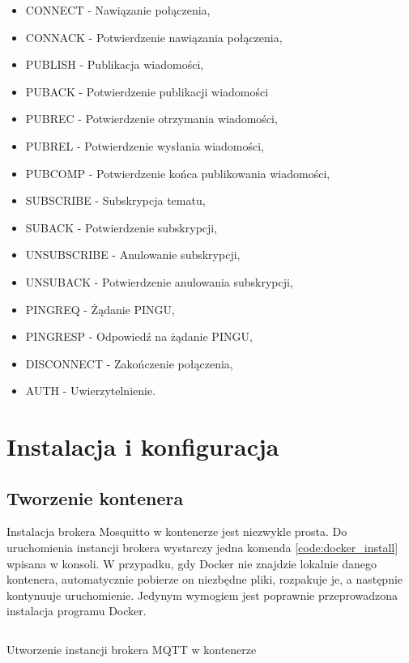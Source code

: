        \begin{itemize}
            \item CONNECT - Nawiązanie połączenia,
            \item CONNACK - Potwierdzenie nawiązania połączenia,
            \item PUBLISH - Publikacja wiadomości,
            \item PUBACK - Potwierdzenie publikacji wiadomości
            \item PUBREC - Potwierdzenie otrzymania wiadomości,
            \item PUBREL - Potwierdzenie wysłania wiadomości,
            \item PUBCOMP - Potwierdzenie końca publikowania wiadomości,
            \item SUBSCRIBE - Subskrypcja tematu,
            \item SUBACK - Potwierdzenie subskrypcji,
            \item UNSUBSCRIBE - Anulowanie subskrypcji,
            \item UNSUBACK - Potwierdzenie anulowania subskrypcji,
            \item PINGREQ - Żądanie PINGU,
            \item PINGRESP - Odpowiedź na żądanie PINGU,
            \item DISCONNECT - Zakończenie połączenia,
            \item AUTH - Uwierzytelnienie.
        \end{itemize}
        
        
    \section{Instalacja i konfiguracja}
        \subsection{Tworzenie kontenera}
            Instalacja brokera Mosquitto w kontenerze jest niezwykle prosta. Do uruchomienia instancji brokera wystarczy jedna komenda \ref{code:docker_install} wpisana w konsoli. W przypadku, gdy Docker nie znajdzie lokalnie danego kontenera, automatycznie pobierze on niezbędne pliki, rozpakuje je, a następnie kontynuuje uruchomienie. Jedynym wymogiem jest poprawnie przeprowadzona instalacja programu Docker.
            
            \begin{kod}
                \inputminted[lastline=2]{sh}{mqtt/listings/docker.sh}
                \caption{Utworzenie instancji brokera MQTT w kontenerze}
                \label{code:docker_install}
                \vspace{2em}
            \end{kod}
            
